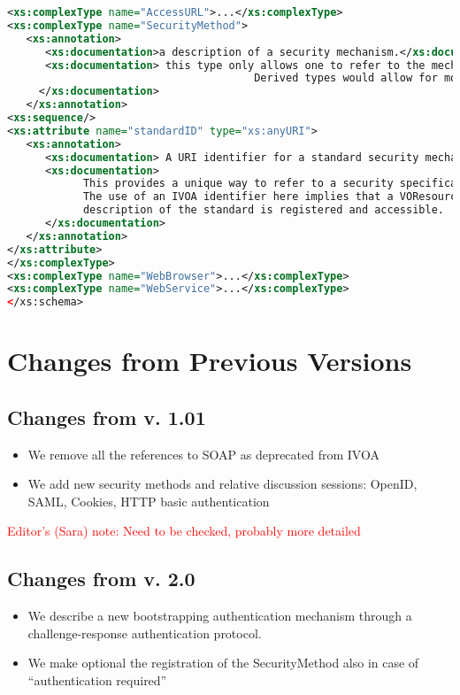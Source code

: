 \documentclass[11pt,a4paper]{ivoa}
\begin{document}
\begin{lstlisting}[language=xml,basicstyle=\footnotesize]
<xs:complexType name="AccessURL">...</xs:complexType>
<xs:complexType name="SecurityMethod">
   <xs:annotation>
      <xs:documentation>a description of a security mechanism.</xs:documentation>
      <xs:documentation> this type only allows one to refer to the mechanism via a URI.
                                       Derived types would allow for more metadata.
     </xs:documentation>
   </xs:annotation>
<xs:sequence/>
<xs:attribute name="standardID" type="xs:anyURI">
   <xs:annotation>
      <xs:documentation> A URI identifier for a standard security mechanism. </xs:documentation>
      <xs:documentation>
            This provides a unique way to refer to a security specification standard.
            The use of an IVOA identifier here implies that a VOResource
            description of the standard is registered and accessible.
      </xs:documentation>
   </xs:annotation>
</xs:attribute>
</xs:complexType>
<xs:complexType name="WebBrowser">...</xs:complexType>
<xs:complexType name="WebService">...</xs:complexType>
</xs:schema>
\end{lstlisting}


\section{Changes from Previous Versions}

\subsection {Changes from v. 1.01}
\begin{itemize}
\item We remove all the references to SOAP as deprecated from IVOA
\item We add new security methods and relative discussion sessions:
	OpenID, SAML, Cookies, HTTP basic authentication
\end{itemize}

\textcolor{red}{Editor's (Sara) note: Need to be checked, probably more
detailed}

\subsection {Changes from v. 2.0}
\begin{itemize}
\item We describe a new bootstrapping authentication mechanism through
	a challenge-response authentication protocol.
\item We make optional the registration of the SecurityMethod also in
	case of ``authentication required''
\end{itemize}



\end{document}

